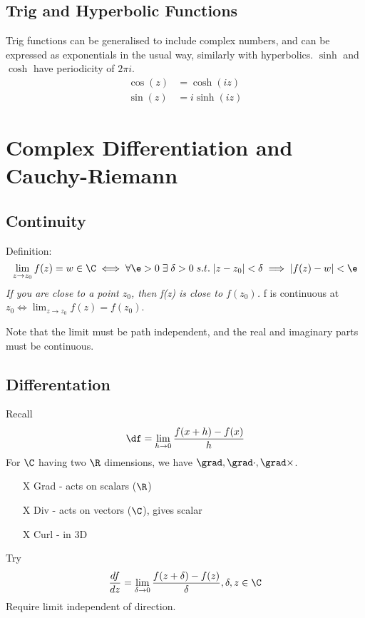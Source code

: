 \documentclass[a4paper, 11pt, normalem]{report}
\begin{document}
\section{Trig and Hyperbolic Functions}
Trig functions can be generalised to include complex numbers, and can be expressed as exponentials in the usual way, similarly with hyperbolics.
$\sinh$ and $\cosh$ have periodicity of $2\pi i$.
\begin{align}
    \cos(z) &= \cosh(iz) \\
    \sin(z) &= i\sinh(iz)
\end{align}

\chapter{Complex Differentiation and Cauchy-Riemann}
\section{Continuity}
Definition:
\begin{equation}
    \lim_{z\to z_0} f(z) = w \in \C \iff \forall \e > 0 \;\exists \;\delta > 0 \; s.t.\; |z-z_0| < \delta \implies |f(z) - w| < \e
\end{equation}
\emph{If you are close to a point $z_0$, then f(z) is close to $f(z_0)$.}
f is continuous at $z_0 \iff \lim_{z\to z_0} f(z) = f(z_0)$.

Note that the limit must be path independent, and the real and imaginary parts must be continuous.

\section{Differentation}
Recall
\begin{equation}
    \df = \lim_{h\to 0} \frac{f(x+h) - f(x)}{h}
\end{equation}
For $\C$ having two $\R$ dimensions, we have $\grad, \grad\cdot, \grad\times$.
\begin{itemize}
    \item[X] Grad - acts on scalars ($\R$)
    \item[X] Div - acts on vectors ($\C$), gives scalar
    \item[X] Curl - in 3D
\end{itemize}
Try
\begin{equation}
    \frac{df}{dz} = \lim_{\delta\to 0} \frac{f(z+\delta) - f(z)}{\delta}, \delta, z \in \C
\end{equation}
Require limit independent of direction.
\end{document}

